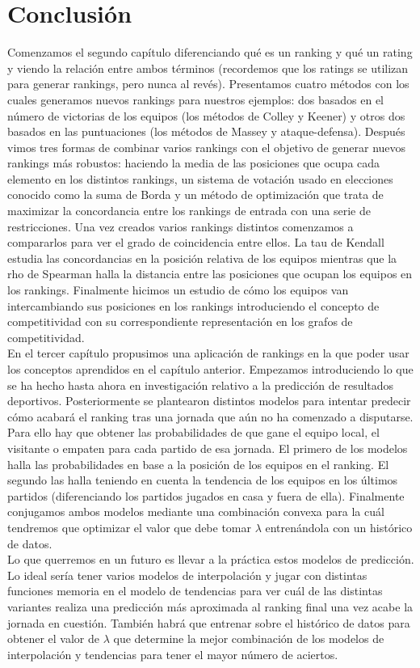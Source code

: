\chapter{Conclusión}
Comenzamos el segundo capítulo diferenciando qué es un ranking y qué un rating y viendo la relación entre ambos términos (recordemos que los ratings se utilizan para generar rankings, pero nunca al revés). Presentamos cuatro métodos con los cuales generamos nuevos rankings para nuestros ejemplos: dos basados en el número de victorias de los equipos (los métodos de Colley y Keener) y otros dos basados en las puntuaciones (los métodos de Massey y ataque-defensa).
Después vimos tres formas de combinar varios rankings con el objetivo de generar nuevos rankings más robustos: haciendo la media de las posiciones que ocupa cada elemento en los distintos rankings, un sistema de votación usado en elecciones conocido como la suma de Borda y un método de optimización que trata de maximizar la concordancia entre los rankings de entrada con una serie de restricciones. 
Una vez creados varios rankings distintos comenzamos a compararlos para ver el grado de coincidencia entre ellos. La tau de Kendall estudia las concordancias en la posición relativa de los equipos mientras que la rho de Spearman halla la distancia entre las posiciones que ocupan los equipos en los rankings. 
Finalmente hicimos un estudio de cómo los equipos van intercambiando sus posiciones en los rankings introduciendo el concepto de competitividad con su correspondiente representación en los grafos de competitividad.\\

En el tercer capítulo propusimos una aplicación de rankings en la que poder usar los conceptos aprendidos en el capítulo anterior. Empezamos introduciendo lo que se ha hecho hasta ahora en investigación relativo a la predicción de resultados deportivos. Posteriormente se plantearon distintos modelos para intentar predecir cómo acabará el ranking tras una jornada que aún no ha comenzado a disputarse. Para ello hay que obtener las probabilidades de que gane el equipo local, el visitante o empaten para cada partido de esa jornada. El primero de los modelos halla las probabilidades en base a la posición de los equipos en el ranking. El segundo las halla teniendo en cuenta la tendencia de los equipos en los últimos partidos (diferenciando los partidos jugados en casa y fuera de ella). Finalmente conjugamos ambos modelos mediante una combinación convexa para la cuál tendremos que optimizar el valor que debe tomar $\lambda$ entrenándola con un histórico de datos.\\

Lo que querremos en un futuro es llevar a la práctica estos modelos de predicción. Lo ideal sería tener varios modelos de interpolación y jugar con distintas funciones memoria en el modelo de tendencias para ver cuál de las distintas variantes realiza una predicción más aproximada al ranking final una vez acabe la jornada en cuestión. También habrá que entrenar sobre el histórico de datos para obtener el valor de $\lambda$ que determine la mejor combinación de los modelos de interpolación y tendencias para tener el mayor número de aciertos.
